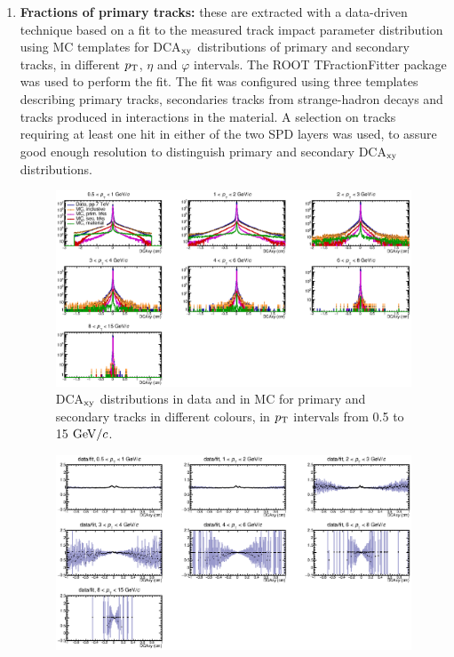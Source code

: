 \begin{enumerate}
\item {\bf Fractions of primary tracks:} these are extracted with a data-driven technique based on a fit to
 the measured track impact parameter distribution using MC templates for 
 DCA$_{\rm xy}$ distributions of primary and secondary tracks, in different
 $p_{\rm T}$, $\eta$ and $\varphi$ intervals. The ROOT TFractionFitter 
 package was used to perform the fit. The fit was configured 
 using three templates describing primary tracks, secondaries tracks
 from strange-hadron decays and tracks produced in interactions in the material. 
 A selection on tracks requiring at least one hit in either of the two SPD layers 
 was used, to assure good enough resolution to distinguish primary and 
 secondary DCA$_{\rm xy}$ distributions.
\begin{figure}[!htb]
\begin{center}
\includegraphics[width=1.2\textwidth]{FigCap4/FitComponents.eps}
\caption{DCA$_{\rm xy}$ distributions in data and in MC for primary and secondary tracks in different colours, in $p_{\rm T}$ intervals from 0.5 to 15 $\mathrm{GeV}/c$.}
\label{fig:DCAxyDataMCVsPt}
\end{center}
\end{figure}
\begin{figure}[!hb]
\begin{center}
\includegraphics[width=1.2\textwidth]{FigCap4/DataOverFit.eps}

\end{center}
\end{figure}
\end{enumerate}
